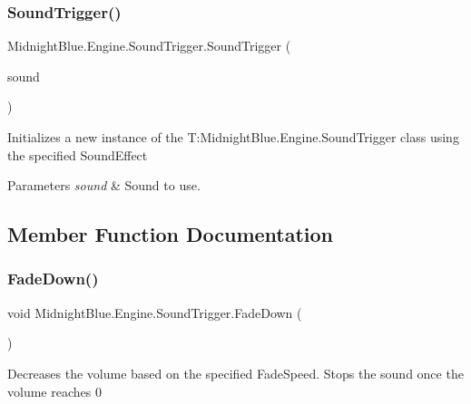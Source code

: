 \subsubsection{\texorpdfstring{Sound\+Trigger()}{SoundTrigger()}}
{\footnotesize\ttfamily Midnight\+Blue.\+Engine.\+Sound\+Trigger.\+Sound\+Trigger (\begin{DoxyParamCaption}\item[{Sound\+Effect}]{sound }\end{DoxyParamCaption})\hspace{0.3cm}{\ttfamily [inline]}}



Initializes a new instance of the T\+:\+Midnight\+Blue.\+Engine.\+Sound\+Trigger class using the specified Sound\+Effect 


\begin{DoxyParams}{Parameters}
{\em sound} & Sound to use.\\
\hline
\end{DoxyParams}


\subsection{Member Function Documentation}
\hypertarget{class_midnight_blue_1_1_engine_1_1_sound_trigger_ac3df1f278adce8dac56f94cc9de8eaca}{}\label{class_midnight_blue_1_1_engine_1_1_sound_trigger_ac3df1f278adce8dac56f94cc9de8eaca} 
\subsubsection{\texorpdfstring{Fade\+Down()}{FadeDown()}}
{\footnotesize\ttfamily void Midnight\+Blue.\+Engine.\+Sound\+Trigger.\+Fade\+Down (\begin{DoxyParamCaption}{ }\end{DoxyParamCaption})\hspace{0.3cm}{\ttfamily [inline]}}



Decreases the volume based on the specified Fade\+Speed. Stops the sound once the volume reaches 0 

\hypertarget{class_midnight_blue_1_1_engine_1_1_sound_trigger_a97b79ca1906cdb3138da1f120d4c64fd}{}\label{class_midnight_blue_1_1_engine_1_1_sound_trigger_a97b79ca1906cdb3138da1f120d4c64fd} 
